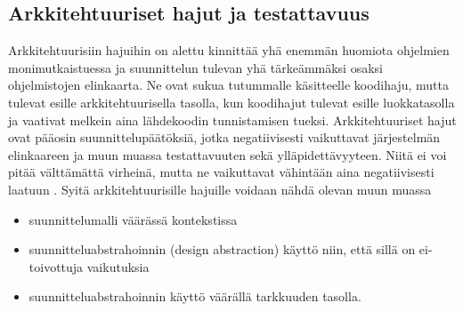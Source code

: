 \documentclass[finnish]{tktltiki2}
\numberwithin{table}{section}
\theoremstyle{definition}
\theoremstyle{remark}
\begin{document}
 

\subsection{Arkkitehtuuriset hajut ja testattavuus} \label{arch_smells_and_testability}

Arkkitehtuurisiin hajuihin on alettu kinnittää yhä enemmän huomiota ohjelmien monimutkaistuessa ja suunnittelun tulevan yhä tärkeämmäksi osaksi ohjelmistojen elinkaarta. Ne ovat sukua tutummalle käsitteelle koodihaju, mutta tulevat esille arkkitehtuurisella tasolla, kun koodihajut tulevat esille luokkatasolla ja vaativat melkein aina lähdekoodin tunnistamisen tueksi. Arkkitehtuuriset hajut ovat pääosin suunnittelupäätöksiä, jotka negatiivisesti vaikuttavat järjestelmän elinkaareen ja muun muassa testattavuuten sekä ylläpidettävyyteen. Niitä ei voi pitää välttämättä virheinä, mutta ne vaikuttavat vähintään aina negatiivisesti laatuun \citep{de_andrade_architectural_2014}. Syitä arkkitehtuurisille hajuille voidaan nähdä olevan muun muassa 

\begin{itemize}
	\item suunnittelumalli väärässä kontekstissa
	\item suunnitteluabstrahoinnin (design abstraction) käyttö niin, että sillä on ei-toivottuja vaikutuksia
	\item suunnitteluabstrahoinnin käyttö väärällä tarkkuuden tasolla.
\end{itemize} 

\end{document}
